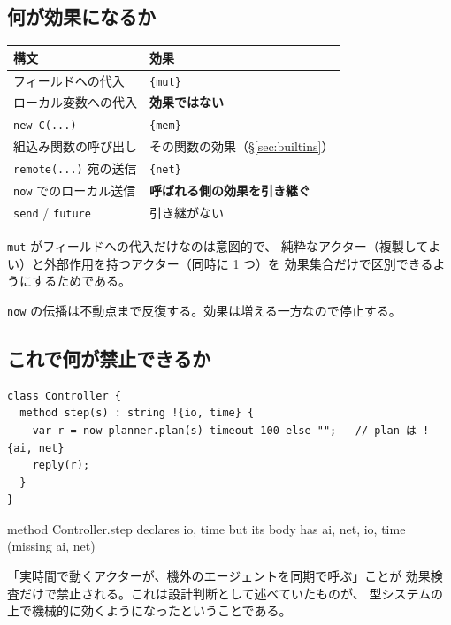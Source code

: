 \documentclass[11pt,a4paper]{ltjsarticle}
\newcommand{\eff}[1]{\texttt{\{#1\}}}
\begin{document}
\subsection{何が効果になるか}

\begin{center}
\small
\begin{tabular}{@{}ll@{}}
\toprule
構文 & 効果 \\
\midrule
フィールドへの代入        & \eff{mut} \\
ローカル変数への代入      & \textbf{効果ではない} \\
\texttt{new C(...)}       & \eff{mem} \\
組込み関数の呼び出し      & その関数の効果（\S\ref{sec:builtins}） \\
\texttt{remote(...)} 宛の送信 & \eff{net} \\
\texttt{now} でのローカル送信 & \textbf{呼ばれる側の効果を引き継ぐ} \\
\texttt{send} / \texttt{future} & 引き継がない \\
\bottomrule
\end{tabular}
\end{center}

\texttt{mut} がフィールドへの代入だけなのは意図的で、
純粋なアクター（複製してよい）と外部作用を持つアクター（同時に 1 つ）を
効果集合だけで区別できるようにするためである。

\texttt{now} の伝播は不動点まで反復する。効果は増える一方なので停止する。

\subsection{これで何が禁止できるか}

\begin{lstlisting}
class Controller {
  method step(s) : string !{io, time} {
    var r = now planner.plan(s) timeout 100 else "";   // plan は !{ai, net}
    reply(r);
  }
}
\end{lstlisting}

\begin{term}
 method Controller.step declares {io, time}
  but its body has {ai, net, io, time} (missing {ai, net})
\end{term}

「実時間で動くアクターが、機外のエージェントを同期で呼ぶ」ことが
効果検査だけで禁止される。これは設計判断として述べていたものが、
型システムの上で機械的に効くようになったということである。
\end{document}
